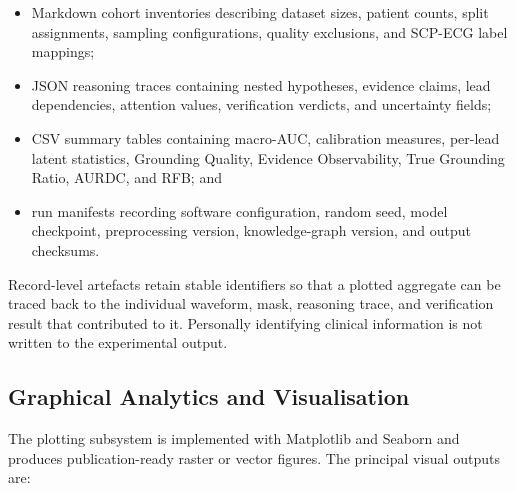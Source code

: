 \documentclass{ssnreview}
\begin{document}
\begin{itemize}
  \item Markdown cohort inventories describing dataset sizes, patient counts, split
  assignments, sampling configurations, quality exclusions, and SCP-ECG label mappings;

  \item JSON reasoning traces containing nested hypotheses, evidence claims, lead
  dependencies, attention values, verification verdicts, and uncertainty fields;

  \item CSV summary tables containing macro-AUC, calibration measures, per-lead latent
  statistics, Grounding Quality, Evidence Observability, True Grounding Ratio, AURDC, and
  RFB; and

  \item run manifests recording software configuration, random seed, model checkpoint,
  preprocessing version, knowledge-graph version, and output checksums.
\end{itemize}

Record-level artefacts retain stable identifiers so that a plotted aggregate can be traced
back to the individual waveform, mask, reasoning trace, and verification result that
contributed to it. Personally identifying clinical information is not written to the
experimental output.

\subsection{Graphical Analytics and Visualisation}

The plotting subsystem is implemented with Matplotlib and Seaborn and produces
publication-ready raster or vector figures. The principal visual outputs are:
\end{document}
